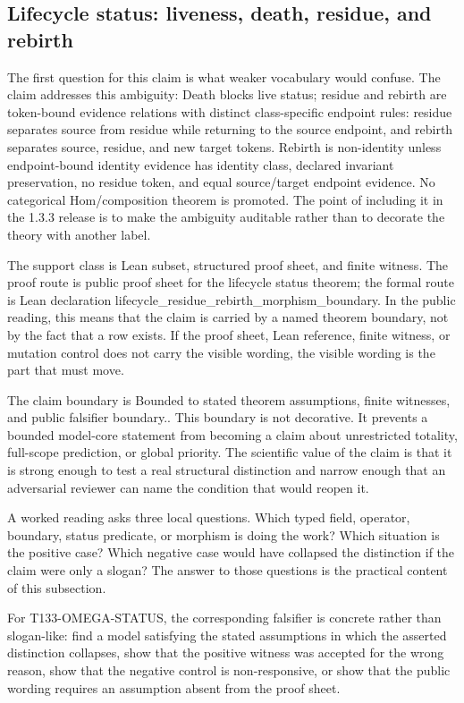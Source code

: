 \subsection{Lifecycle status: liveness, death, residue, and rebirth}
The first question for this claim is what weaker vocabulary would confuse. The claim addresses this ambiguity: Death blocks live status; residue and rebirth are token-bound evidence relations with distinct class-specific endpoint rules: residue separates source from residue while returning to the source endpoint, and rebirth separates source, residue, and new target tokens. Rebirth is non-identity unless endpoint-bound identity evidence has identity class, declared invariant preservation, no residue token, and equal source/target endpoint evidence. No categorical Hom/composition theorem is promoted. The point of including it in the 1.3.3 release is to make the ambiguity auditable rather than to decorate the theory with another label.

The support class is Lean subset, structured proof sheet, and finite witness. The proof route is public proof sheet for the lifecycle status theorem; the formal route is Lean declaration lifecycle\_residue\_rebirth\_morphism\_boundary. In the public reading, this means that the claim is carried by a named theorem boundary, not by the fact that a row exists. If the proof sheet, Lean reference, finite witness, or mutation control does not carry the visible wording, the visible wording is the part that must move.

The claim boundary is Bounded to stated theorem assumptions, finite witnesses, and public falsifier boundary.. This boundary is not decorative. It prevents a bounded model-core statement from becoming a claim about unrestricted totality, full-scope prediction, or global priority. The scientific value of the claim is that it is strong enough to test a real structural distinction and narrow enough that an adversarial reviewer can name the condition that would reopen it.

A worked reading asks three local questions. Which typed field, operator, boundary, status predicate, or morphism is doing the work? Which situation is the positive case? Which negative case would have collapsed the distinction if the claim were only a slogan? The answer to those questions is the practical content of this subsection.

For T133-OMEGA-STATUS, the corresponding falsifier is concrete rather than slogan-like: find a model satisfying the stated assumptions in which the asserted distinction collapses, show that the positive witness was accepted for the wrong reason, show that the negative control is non-responsive, or show that the public wording requires an assumption absent from the proof sheet.

